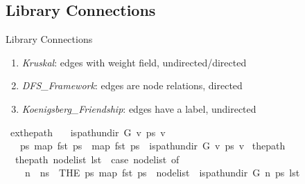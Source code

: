 \documentclass[%
	sans,
	12pt,
]{beamer}
\def\isacartoucheopen{}%
\def\isacartoucheclose{}%
\begin{document}
\subsection{Library Connections}
\begin{frame}{Library Connections}\pause
\begin{enumerate}
	\item \textit{Kruskal}: edges with weight field, undirected/directed\pause
	\item \textit{DFS\_Framework}: edges are node relations, directed\pause
	\item \textit{Koenigsberg\_Friendship}: edges have a label, undirected\pause
\end{enumerate}
\begin{isabelle}
\isamarkupfalse%
\ ex{}{\isacharunderscore}the{\isacharunderscore}path{\isacharcolon}\isanewline
\ \ \ {\isacartoucheopen}is{\isacharunderscore}path{\isacharunderscore}undir\ G\ v\ ps\ v{\isacharprime}{\isacartoucheclose}\isanewline
\ \ \ {\isacartoucheopen}{\isasymexists}{\isacharbang}ps{\isacharprime}{\isachardot}\ map\ fst\ ps{\isacharprime}\ {\isacharequal}\ map\ fst\ ps\ {\isasymand}\ is{\isacharunderscore}path{\isacharunderscore}undir\ G\ v\ ps{\isacharprime}\ v{\isacharprime}{\isacartoucheclose}
\isanewline \pause
\isanewline
	\isamarkupfalse%
	\ the{\isacharunderscore}path\ \isanewline
	\ \ {\isacartoucheopen}the{\isacharunderscore}path\ nodelist\ lst\ {\isacharequal}\ {\isacharparenleft}case\ nodelist\ of\isanewline
	\ \ \ \ {\isacharbrackleft}{\isacharbrackright}\ {\isasymRightarrow}\ {\isacharbrackleft}{\isacharbrackright}\ {\isacharbar}\isanewline
	\ \ \ \ n\ {\isacharhash}\ ns\ {\isasymRightarrow}\ THE\ ps{\isachardot}\ map\ fst\ ps\ {\isacharequal}\ nodelist\ {\isasymand}\ is{\isacharunderscore}path{\isacharunderscore}undir\ G\ n\ ps\ lst{\isacharparenright}{\isacartoucheclose}
\end{isabelle}

\end{frame}
\end{document}
